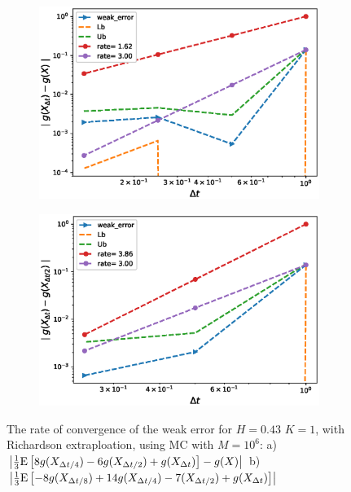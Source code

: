 \documentclass[11pt]{article}
\newcommand{\expt}[1]{\mathrm{E}\left[#1\right]}
\begin{document}
\begin{figure}[h!]
	\centering
	\begin{subfigure}{.4\textwidth}
		\centering
		\includegraphics[width=1\linewidth]{./figures/rBergomi_weak_error_rates/with_richardson/H_043/weak_convergence_order_Bergomi_H_043_K_1_richardson_level2_relative_M_10_6}
		\caption{}
		\label{fig:sub3}
	\end{subfigure}%
	\begin{subfigure}{.4\textwidth}
		\centering
		\includegraphics[width=1\linewidth]{./figures/rBergomi_weak_error_rates/with_richardson/H_043/weak_convergence_order_differences_Bergomi_H_043_K_1_richardson_level2_relative_M_10_6}
		\caption{}
		\label{fig:sub4}
	\end{subfigure}
	
	\caption{The rate of convergence of the weak error for $H=0.43$ $K=1$, with Richardson extraploation, using MC with $M=10^6$: a) $\abs{\frac{1}{3}\expt{8 g(X_{\Delta t/4}) -6g(X_{\Delta t/2}) +g(X_{\Delta t})}-g(X)}$  b) $\abs{\frac{1}{3}\expt{-8 g(X_{\Delta t/8}) +14g(X_{\Delta t/4})-7 (X_{\Delta t/2}) +g(X_{\Delta t})}}$}
	\label{fig:Weak_rate_H_043_with_rich_level2}
\end{figure}
\end{document}
